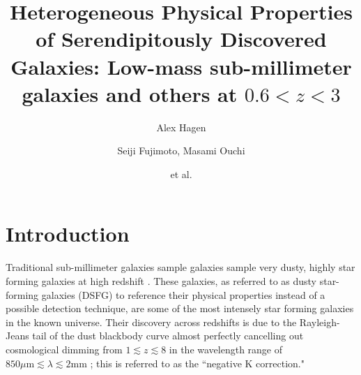 \documentclass[preprint,natbib209]{aastex}
\begin{document}
\title{Heterogeneous Physical Properties of Serendipitously Discovered Galaxies: 
Low-mass sub-millimeter galaxies and others at $0.6 < z < 3$}

\author{Alex Hagen}

\author{Seiji Fujimoto, Masami Ouchi}

\author{et al.}


\begin{abstract} 

\end{abstract}


\section{Introduction}
\label{sec:intro}

Traditional sub-millimeter galaxies sample galaxies sample very dusty, highly star forming galaxies at high redshift \citep[e.g.][and references therein]{blain02, lagache05, casey14, lutz14}. These galaxies, as referred to as dusty star-forming galaxies (DSFG) to reference their physical properties instead of a possible detection technique, are some of the most intensely star forming galaxies in the known universe. Their discovery across redshifts is due to the Rayleigh-Jeans tail of the dust blackbody curve almost perfectly cancelling out cosmological dimming from $1 \lesssim z \lesssim 8$ in the wavelength range of $850\text{$\mu$m} \lesssim \lambda \lesssim 2\text{mm}$ \citep[See][Figure 3]{casey14}; this is referred to as the ``negative K correction."
\end{document}
